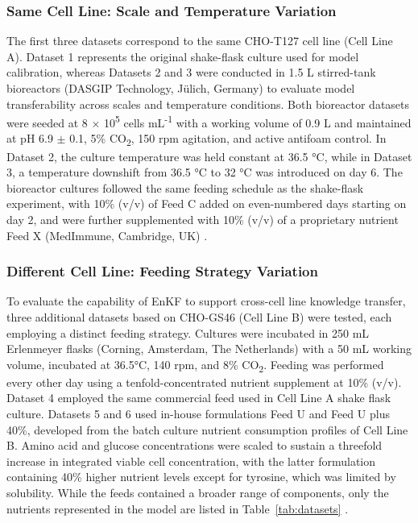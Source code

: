 \subsubsection{Same Cell Line: Scale and Temperature Variation}
The first three datasets correspond to the same CHO-T127 cell line (Cell Line A). Dataset 1 represents the original shake-flask culture used for model calibration, whereas Datasets 2 and 3 were conducted in 1.5 L stirred-tank bioreactors (DASGIP Technology, Jülich, Germany) to evaluate model transferability across scales and temperature conditions. Both bioreactor datasets were seeded at 8 × 10\textsuperscript{5} cells mL\textsuperscript{-1} with a working volume of 0.9 L and maintained at pH 6.9 $\pm$ 0.1, 5\% CO\textsubscript{2}, 150 rpm agitation, and active antifoam control. In Dataset 2, the culture temperature was held constant at 36.5 °C, while in Dataset 3, a temperature downshift from 36.5 °C to 32 °C was introduced on day 6. The bioreactor cultures followed the same feeding schedule as the shake-flask experiment, with 10\% (v/v) of Feed C added on even-numbered days starting on day 2, and were further supplemented with 10\% (v/v) of a proprietary nutrient Feed X (MedImmune, Cambridge, UK) \cite{Sou2015HowGlycosylation}.

\subsubsection{Different Cell Line: Feeding Strategy Variation}
To evaluate the capability of EnKF to support cross-cell line knowledge transfer, three additional datasets based on CHO-GS46 (Cell Line B) were tested, each employing a distinct feeding strategy. Cultures were incubated in 250 mL Erlenmeyer flasks (Corning, Amsterdam, The Netherlands) with a 50 mL working volume, incubated at 36.5°C, 140 rpm, and 8\% CO\textsubscript{2}. Feeding was performed every other day using a tenfold-concentrated nutrient supplement at 10\% (v/v). Dataset 4 employed the same commercial feed used in Cell Line A shake flask culture. Datasets 5 and 6 used in-house formulations Feed U and Feed U plus 40\%, developed from the batch culture nutrient consumption profiles of Cell Line B. Amino acid and glucose concentrations were scaled to sustain a threefold increase in integrated viable cell concentration, with the latter formulation containing 40\% higher nutrient levels except for tyrosine, which was limited by solubility. While the feeds contained a broader range of components, only the nutrients represented in the model are listed in Table~\ref{tab:datasets} \cite{Kyriakopoulos2014ACulture}.


